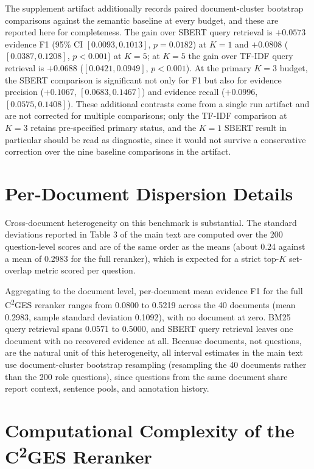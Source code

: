 \documentclass[11pt,letterpaper]{article}
\newcommand{\cges}{C\textsuperscript{2}GES}
\begin{document}
The supplement artifact additionally records paired document-cluster bootstrap comparisons against the semantic baseline at every budget, and these are reported here for completeness. The gain over SBERT query retrieval is $+0.0573$ evidence F1 (95\% CI $[0.0093, 0.1013]$, $p=0.0182$) at $K=1$ and $+0.0808$ ($[0.0387, 0.1208]$, $p<0.001$) at $K=5$; at $K=5$ the gain over TF-IDF query retrieval is $+0.0688$ ($[0.0421, 0.0949]$, $p<0.001$). At the primary $K=3$ budget, the SBERT comparison is significant not only for F1 but also for evidence precision ($+0.1067$, $[0.0683, 0.1467]$) and evidence recall ($+0.0996$, $[0.0575, 0.1408]$). These additional contrasts come from a single run artifact and are not corrected for multiple comparisons; only the TF-IDF comparison at $K=3$ retains pre-specified primary status, and the $K=1$ SBERT result in particular should be read as diagnostic, since it would not survive a conservative correction over the nine baseline comparisons in the artifact.

\section{Per-Document Dispersion Details}
\label{sec:s2}

Cross-document heterogeneity on this benchmark is substantial. The standard deviations reported in Table 3 of the main text are computed over the 200 question-level scores and are of the same order as the means (about 0.24 against a mean of 0.2983 for the full reranker), which is expected for a strict top-$K$ set-overlap metric scored per question.

Aggregating to the document level, per-document mean evidence F1 for the full \cges{} reranker ranges from 0.0800 to 0.5219 across the 40 documents (mean 0.2983, sample standard deviation 0.1092), with no document at zero. BM25 query retrieval spans 0.0571 to 0.5000, and SBERT query retrieval leaves one document with no recovered evidence at all. Because documents, not questions, are the natural unit of this heterogeneity, all interval estimates in the main text use document-cluster bootstrap resampling (resampling the 40 documents rather than the 200 role questions), since questions from the same document share report context, sentence pools, and annotation history.

\section{Computational Complexity of the \cges{} Reranker}
\label{sec:s3}
\end{document}
